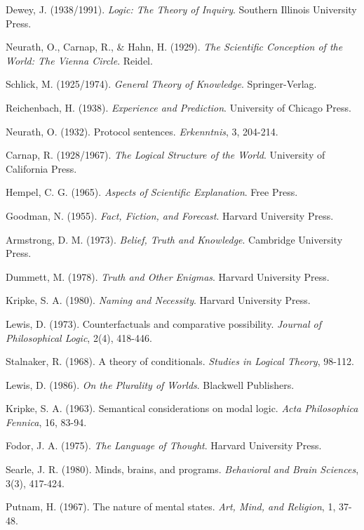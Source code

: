 \documentclass[12pt,a4paper]{article}
\begin{document}
\begin{thebibliography}{99}
Dewey, J. (1938/1991). \textit{Logic: The Theory of Inquiry}. Southern Illinois University Press.

Neurath, O., Carnap, R., & Hahn, H. (1929). \textit{The Scientific Conception of the World: The Vienna Circle}. Reidel.

Schlick, M. (1925/1974). \textit{General Theory of Knowledge}. Springer-Verlag.

Reichenbach, H. (1938). \textit{Experience and Prediction}. University of Chicago Press.

Neurath, O. (1932). Protocol sentences. \textit{Erkenntnis}, 3, 204-214.

Carnap, R. (1928/1967). \textit{The Logical Structure of the World}. University of California Press.

Hempel, C. G. (1965). \textit{Aspects of Scientific Explanation}. Free Press.

Goodman, N. (1955). \textit{Fact, Fiction, and Forecast}. Harvard University Press.

Armstrong, D. M. (1973). \textit{Belief, Truth and Knowledge}. Cambridge University Press.

Dummett, M. (1978). \textit{Truth and Other Enigmas}. Harvard University Press.

Kripke, S. A. (1980). \textit{Naming and Necessity}. Harvard University Press.

Lewis, D. (1973). Counterfactuals and comparative possibility. \textit{Journal of Philosophical Logic}, 2(4), 418-446.

Stalnaker, R. (1968). A theory of conditionals. \textit{Studies in Logical Theory}, 98-112.

Lewis, D. (1986). \textit{On the Plurality of Worlds}. Blackwell Publishers.

Kripke, S. A. (1963). Semantical considerations on modal logic. \textit{Acta Philosophica Fennica}, 16, 83-94.

Fodor, J. A. (1975). \textit{The Language of Thought}. Harvard University Press.

Searle, J. R. (1980). Minds, brains, and programs. \textit{Behavioral and Brain Sciences}, 3(3), 417-424.

Putnam, H. (1967). The nature of mental states. \textit{Art, Mind, and Religion}, 1, 37-48.

\end{thebibliography}
\end{document}
